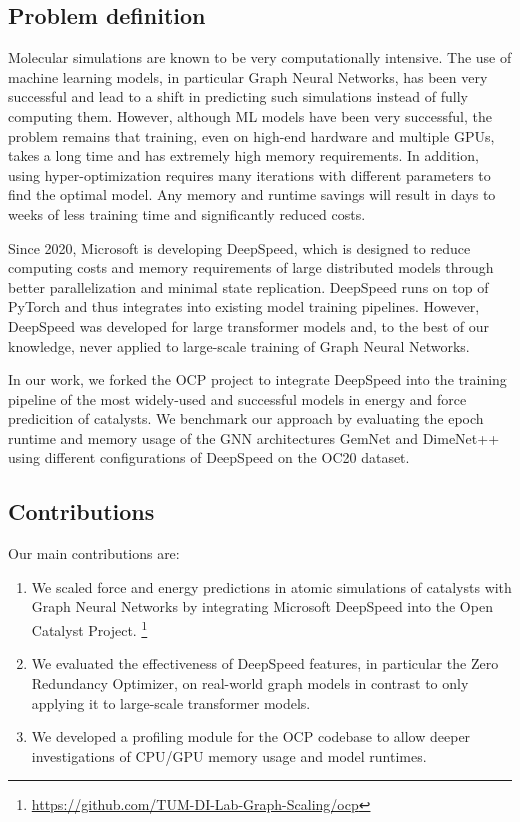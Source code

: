 \subsection{Problem definition}

Molecular simulations are known to be very computationally intensive. The use of machine learning models, in particular 
Graph Neural Networks, has been very successful and lead to a shift in predicting such simulations instead of 
fully computing them. However, although ML models have been very successful, the problem remains that training, 
even on high-end hardware and multiple GPUs, takes a long time and has extremely high memory requirements. In 
addition, using hyper-optimization requires many iterations with different parameters to find the optimal model. 
Any memory and runtime savings will result in days to weeks of less training time and significantly reduced costs.

Since 2020, Microsoft is developing DeepSpeed, which is designed to reduce computing costs and memory 
requirements of large distributed models through better parallelization and minimal state replication. DeepSpeed 
runs on top of PyTorch and thus integrates into existing model training pipelines. However, DeepSpeed was developed 
for large transformer models and, to the best of our knowledge, never applied to large-scale training of Graph Neural Networks.

In our work, we forked the OCP project to integrate DeepSpeed into the training pipeline of the most widely-used 
and successful models in energy and force predicition of catalysts. 
We benchmark our approach by evaluating the epoch runtime and memory usage of the GNN architectures GemNet and 
DimeNet++ using different configurations of DeepSpeed on the OC20 dataset.


\subsection{Contributions}

Our main contributions are:

\begin{enumerate}
    \item We scaled force and energy predictions in atomic simulations of catalysts with Graph Neural Networks 
    by integrating Microsoft DeepSpeed into the Open Catalyst Project.
    \footnote{\url{https://github.com/TUM-DI-Lab-Graph-Scaling/ocp}}
    \item We evaluated the effectiveness of DeepSpeed features, in particular the Zero Redundancy Optimizer, on 
    real-world graph models in contrast to only applying it to large-scale transformer models.
    \item We developed a profiling module for the OCP codebase to allow deeper investigations of CPU/GPU memory 
    usage and model runtimes.
\end{enumerate}

